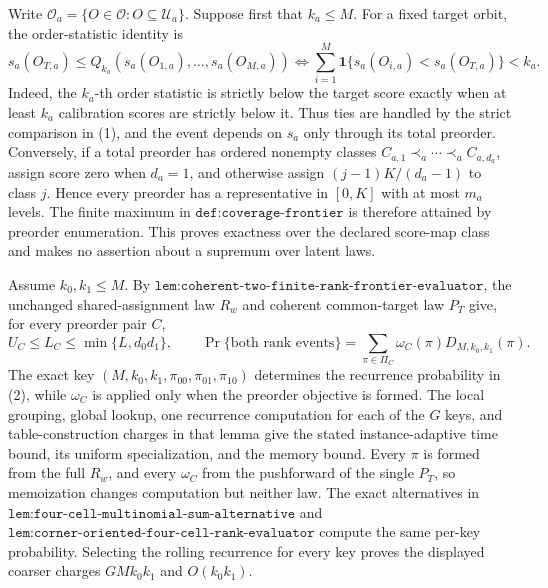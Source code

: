 Write \(\mathcal O_a=\{O\in\mathcal O:O\subseteq\mathcal U_a\}\). Suppose first that \(k_a\le M\). For a fixed target orbit, the order-statistic identity is
\[
s_a(O_{T,a})\le Q_{k_a}(s_a(O_{1,a}),\ldots,s_a(O_{M,a}))
\Longleftrightarrow
\sum_{i=1}^M\mathbf 1\{s_a(O_{i,a})<s_a(O_{T,a})\}<k_a.
\tag{1}
\]
Indeed, the \(k_a\)-th order statistic is strictly below the target score exactly when at least \(k_a\) calibration scores are strictly below it. Thus ties are handled by the strict comparison in (1), and the event depends on \(s_a\) only through its total preorder. Conversely, if a total preorder has ordered nonempty classes \(C_{a,1}\prec_a\cdots\prec_a C_{a,d_a}\), assign score zero when \(d_a=1\), and otherwise assign \((j-1)K/(d_a-1)\) to class \(j\). Hence every preorder has a representative in \([0,K]\) with at most \(m_a\) levels. The finite maximum in \(\texttt{def:coverage-frontier}\) is therefore attained by preorder enumeration. This proves exactness over the declared score-map class and makes no assertion about a supremum over latent laws.

Assume \(k_0,k_1\le M\). By \(\texttt{lem:coherent-two-finite-rank-frontier-evaluator}\), the unchanged shared-assignment law \(R_w\) and coherent common-target law \(P_T\) give, for every preorder pair \(C\),
\[
U_C\le L_C\le\min\{L,d_0d_1\},\qquad
\Pr\{\text{both rank events}\}=\sum_{\pi\in\Pi_C}\omega_C(\pi)D_{M,k_0,k_1}(\pi).
\tag{2}
\]
The exact key \((M,k_0,k_1,\pi_{00},\pi_{01},\pi_{10})\) determines the recurrence probability in (2), while \(\omega_C\) is applied only when the preorder objective is formed. The local grouping, global lookup, one recurrence computation for each of the \(G\) keys, and table-construction charges in that lemma give the stated instance-adaptive time bound, its uniform specialization, and the memory bound. Every \(\pi\) is formed from the full \(R_w\), and every \(\omega_C\) from the pushforward of the single \(P_T\), so memoization changes computation but neither law. The exact alternatives in \(\texttt{lem:four-cell-multinomial-sum-alternative}\) and \(\texttt{lem:corner-oriented-four-cell-rank-evaluator}\) compute the same per-key probability. Selecting the rolling recurrence for every key proves the displayed coarser charges \(GMk_0k_1\) and \(O(k_0k_1)\).

